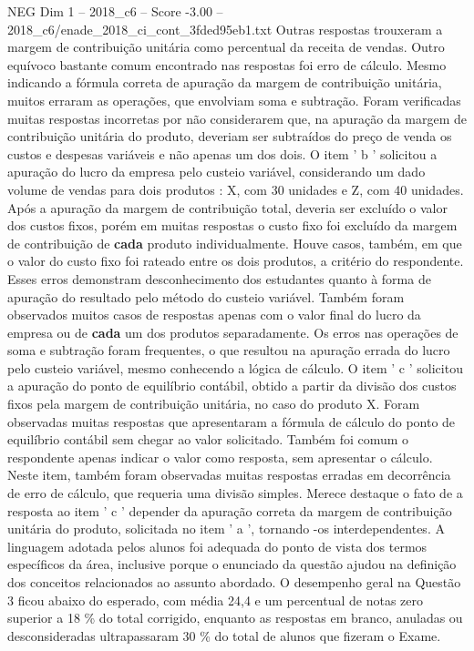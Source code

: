 \begin{textsample}{NEG Dim 1 – 2018\_c6 – Score -3.00 – 2018\_c6/enade\_2018\_ci\_cont\_3fded95eb1.txt}
Outras respostas trouxeram a margem de contribuição unitária como percentual da receita de vendas.
Outro equívoco bastante comum encontrado nas respostas foi erro de cálculo.
Mesmo indicando a fórmula correta de apuração da margem de contribuição unitária, muitos erraram as operações, que envolviam soma e subtração.
Foram verificadas muitas respostas incorretas por não considerarem que, na apuração da margem de contribuição unitária do produto, deveriam ser subtraídos do preço de venda os custos e despesas variáveis e não apenas um dos dois.
O item ' b ' solicitou a apuração do lucro da empresa pelo custeio variável, considerando um dado volume de vendas para dois produtos : X, com 30 unidades e Z, com 40 unidades.
Após a apuração da margem de contribuição total, deveria ser excluído o valor dos custos fixos, porém em muitas respostas o custo fixo foi excluído da margem de contribuição de \textbf{cada} produto individualmente.
Houve casos, também, em que o valor do custo fixo foi rateado entre os dois produtos, a critério do respondente.
Esses erros demonstram desconhecimento dos estudantes quanto à forma de apuração do resultado pelo método do custeio variável.
Também foram observados muitos casos de respostas apenas com o valor final do lucro da empresa ou de \textbf{cada} um dos produtos separadamente.
Os erros nas operações de soma e subtração foram frequentes, o que resultou na apuração errada do lucro pelo custeio variável, mesmo conhecendo a lógica de cálculo.
O item ' c ' solicitou a apuração do ponto de equilíbrio contábil, obtido a partir da divisão dos custos fixos pela margem de contribuição unitária, no caso do produto X.
Foram observadas muitas respostas que apresentaram a fórmula de cálculo do ponto de equilíbrio contábil sem chegar ao valor solicitado.
Também foi comum o respondente apenas indicar o valor como resposta, sem apresentar o cálculo.
Neste item, também foram observadas muitas respostas erradas em decorrência de erro de cálculo, que requeria uma divisão simples.
Merece destaque o fato de a resposta ao item ’ c ’ depender da apuração correta da margem de contribuição unitária do produto, solicitada no item ' a ', tornando -os interdependentes.
A linguagem adotada pelos alunos foi adequada do ponto de vista dos termos específicos da área, inclusive porque o enunciado da questão ajudou na definição dos conceitos relacionados ao assunto abordado.
O desempenho geral na Questão 3 ficou abaixo do esperado, com média 24,4 e um percentual de notas zero superior a 18 \% do total corrigido, enquanto as respostas em branco, anuladas ou desconsideradas ultrapassaram 30 \% do total de alunos que fizeram o Exame.

\end{textsample}
